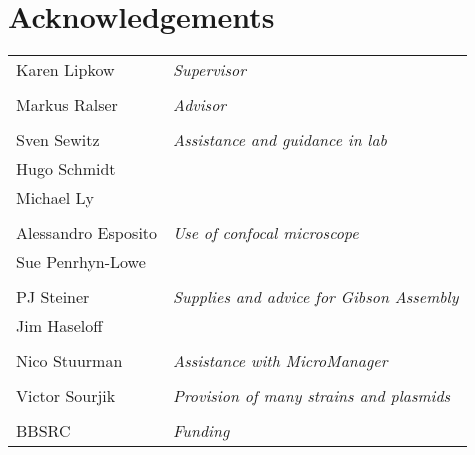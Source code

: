 \documentclass[../main.tex]{subfiles}
\begin{document}
\section*{Acknowledgements}

\begin{tabular}{p{5cm}l}
Karen Lipkow					&	\textit{Supervisor}\\&\\
Markus Ralser				&	\textit{Advisor}\\&\\
Sven Sewitz					& 	{\textit{Assistance and guidance in lab}}\\
Hugo Schmidt					&	\\
Michael Ly					&	\\&\\
Alessandro Esposito			&	{\textit{Use of confocal microscope}}\\
Sue Penrhyn-Lowe				&	\\&\\
PJ Steiner					&	{\textit{Supplies and advice for Gibson Assembly}}\\
Jim Haseloff					&	\\&\\
Nico Stuurman				&	\textit{Assistance with MicroManager}\\&\\
Victor Sourjik				&	\textit{Provision of many strains and plasmids}\\&\\
BBSRC						&	\textit{Funding}
\end{tabular}
\end{document}
